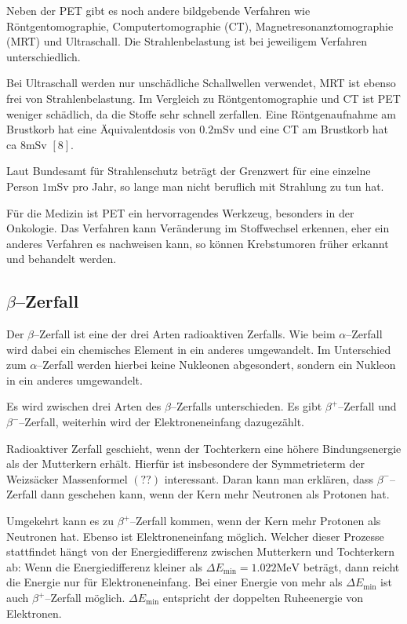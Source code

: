 \documentclass[12pt,a4paper]{scrartcl}
\numberwithin{equation}{section} %
\newcommand{\pu}[1]{\ensuremath{\mathrm{#1}}}
\renewcommand{\[}{} %
\renewcommand{\]}{\noindent} %
\begin{document}
Neben der PET gibt es noch andere bildgebende Verfahren wie
Röntgentomographie, Computertomographie (CT), Magnetresonanztomographie
(MRT) und Ultraschall. Die Strahlenbelastung ist bei jeweiligem
Verfahren unterschiedlich.

Bei Ultraschall werden nur unschädliche Schallwellen verwendet, MRT ist
ebenso frei von Strahlenbelastung. Im Vergleich zu Röntgentomographie
und CT ist PET weniger schädlich, da die Stoffe sehr schnell zerfallen.
Eine Röntgenaufnahme am Brustkorb hat eine Äquivalentdosis von
\(\pu{0.2 mSv}\) und eine CT am Brustkorb hat ca \(\pu{8 mSv}\) \([8]\).

Laut Bundesamt für Strahlenschutz beträgt der Grenzwert für eine
einzelne Person \(\pu{1 mSv}\) pro Jahr, so lange man nicht beruflich
mit Strahlung zu tun hat.

Für die Medizin ist PET ein hervorragendes Werkzeug, besonders in der
Onkologie. Das Verfahren kann Veränderung im Stoffwechsel erkennen, eher
ein anderes Verfahren es nachweisen kann, so können Krebstumoren früher
erkannt und behandelt werden.

\hypertarget{betazerfall}{%
\subsection{\texorpdfstring{\(\beta\)--Zerfall}{\textbackslash beta--Zerfall}}\label{betazerfall}}

Der \(\beta\)--Zerfall ist eine der drei Arten radioaktiven Zerfalls.
Wie beim \(\alpha\)--Zerfall wird dabei ein chemisches Element in ein
anderes umgewandelt. Im Unterschied zum \(\alpha\)--Zerfall werden
hierbei keine Nukleonen abgesondert, sondern ein Nukleon in ein anderes
umgewandelt.

Es wird zwischen drei Arten des \(\beta\)--Zerfalls unterschieden. Es
gibt \(\beta^+\)--Zerfall und \(\beta^-\)--Zerfall, weiterhin wird der
Elektroneneinfang dazugezählt.

Radioaktiver Zerfall geschieht, wenn der Tochterkern eine höhere
Bindungsenergie als der Mutterkern erhält. Hierfür ist insbesondere der
Symmetrieterm der Weizsäcker Massenformel \((??)\) interessant. Daran
kann man erklären, dass \(\beta^-\)--Zerfall dann geschehen kann, wenn
der Kern mehr Neutronen als Protonen hat.

Umgekehrt kann es zu \(\beta^+\)--Zerfall kommen, wenn der Kern mehr
Protonen als Neutronen hat. Ebenso ist Elektroneneinfang möglich.
Welcher dieser Prozesse stattfindet hängt von der Energiedifferenz
zwischen Mutterkern und Tochterkern ab: Wenn die Energiedifferenz
kleiner als \(\Delta E_\mathrm{min}=\pu{1.022 MeV}\) beträgt, dann
reicht die Energie nur für Elektroneneinfang. Bei einer Energie von mehr
als \(\Delta E_\mathrm{min}\) ist auch \(\beta^+\)--Zerfall möglich.
\(\Delta E_\mathrm{min}\) entspricht der doppelten Ruheenergie von
Elektronen.
\end{document}
